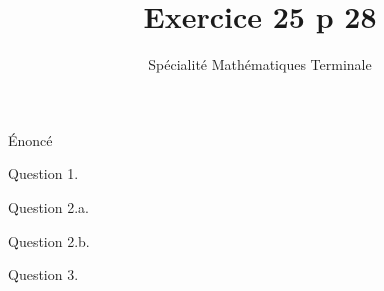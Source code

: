 \documentclass[handout,%
french,onlymath]{beamer}
\title{Exercice 25 p 28}
\author{Spécialité Mathématiques Terminale}\institute{\augustin{0.2}}
\date{}
\begin{document}



\begin{frame}
 \titlepage
\end{frame}
\begin{frame}{Énoncé}



\end{frame}
\begin{frame}{Question 1.}


\end{frame}
\begin{frame}{Question 2.a.}


\end{frame}
\begin{frame}{Question 2.b.}



\end{frame}
\begin{frame}{Question 3.}



\end{frame}


\end{document}
